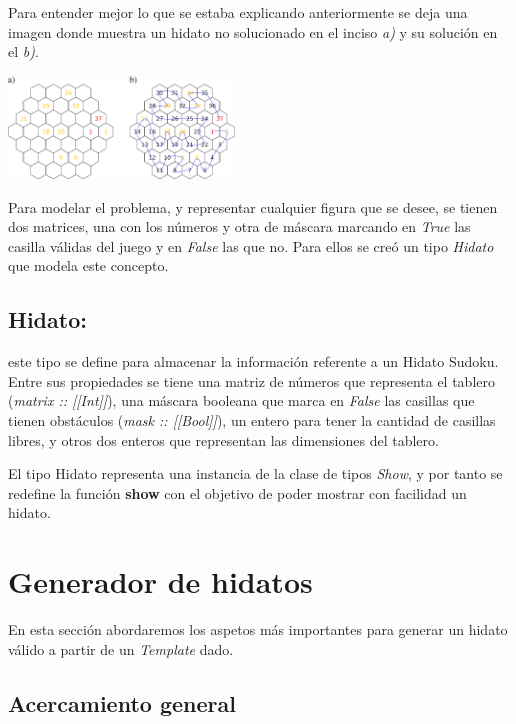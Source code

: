 \documentclass[10pt]{amsart}
\begin{document}
        Para entender mejor lo que se estaba explicando anteriormente se deja una imagen donde muestra un hidato no solucionado en el inciso \textit{a)} y su soluci\'on en el \textit{b)}.  

        \begin{center}
            \includegraphics[width=6cm]{hidato-sudoku.png}
        \end{center}

        Para modelar el problema, y representar cualquier figura que se desee, se tienen dos matrices, una con los n\'umeros y otra de m\'ascara marcando en \textit{True} las casilla v\'alidas del juego y en \textit{False} las que no. Para ellos se cre\'o un tipo \textit{Hidato} que modela este concepto.

        \subsection*{Hidato:} este tipo se define para almacenar la informaci\'on referente a un Hidato Sudoku. Entre sus propiedades se tiene una matriz de n\'umeros que representa el tablero (\textit{matrix :: [[Int]]}), una m\'ascara booleana que marca en \textit{False} las casillas que tienen obst\'aculos (\textit{mask :: [[Bool]]}), un entero para tener la cantidad de casillas libres, y otros dos enteros que representan las dimensiones del tablero. 

        El tipo Hidato representa una instancia de la clase de tipos \textit{Show}, y por tanto se redefine la funci\'on \textbf{show} con el objetivo de poder mostrar con facilidad un hidato.
            
	\section*{Generador de hidatos}

        En esta secci\'on abordaremos los aspetos m\'as importantes para generar un hidato v\'alido a partir de un \textit{Template} dado.
	
        \subsection*{Acercamiento general}
\end{document}
